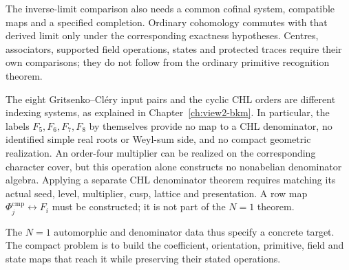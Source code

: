 The inverse-limit comparison also needs a common cofinal system,
compatible maps and a specified completion. Ordinary cohomology
commutes with that derived limit only under the corresponding
exactness hypotheses. Centres, associators, supported field
operations, states and protected traces require their own comparisons;
they do not follow from the ordinary primitive recognition theorem.

The eight Gritsenko--Cl\'ery input pairs and the cyclic CHL orders
are different indexing systems, as explained in
Chapter~\ref{ch:view2-bkm}. In particular, the labels
\(F_5,F_6,F_7,F_8\) by themselves provide no map to a CHL
denominator, no identified simple real roots or Weyl-sum side, and
no compact geometric realization. An order-four multiplier can be
realized on the corresponding character cover, but this operation
alone constructs no nonabelian denominator algebra. Applying a
separate CHL denominator theorem requires matching its actual seed,
level, multiplier, cusp, lattice and presentation. A row map
\(\Phi_j^{\mathrm{cmp}}\leftrightarrow F_i\) must be constructed;
it is not part of the \(N=1\) theorem.

The \(N=1\) automorphic and denominator data thus specify a concrete
target. The compact problem is to build the coefficient, orientation,
primitive, field and state maps that reach it while preserving their
stated operations.
